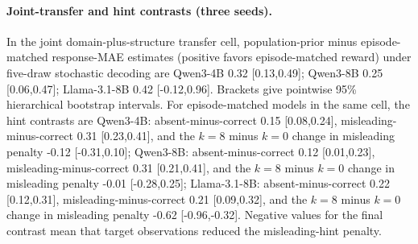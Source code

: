 \paragraph{Joint-transfer and hint contrasts (three seeds).} In the joint domain-plus-structure transfer cell, population-prior minus episode-matched response-MAE estimates (positive favors episode-matched reward) under five-draw stochastic decoding are Qwen3-4B 0.32 [0.13,0.49]; Qwen3-8B 0.25 [0.06,0.47]; Llama-3.1-8B 0.42 [-0.12,0.96]. Brackets give pointwise 95\% hierarchical bootstrap intervals. For episode-matched models in the same cell, the hint contrasts are Qwen3-4B: absent-minus-correct 0.15 [0.08,0.24], misleading-minus-correct 0.31 [0.23,0.41], and the $k=8$ minus $k=0$ change in misleading penalty -0.12 [-0.31,0.10]; Qwen3-8B: absent-minus-correct 0.12 [0.01,0.23], misleading-minus-correct 0.31 [0.21,0.41], and the $k=8$ minus $k=0$ change in misleading penalty -0.01 [-0.28,0.25]; Llama-3.1-8B: absent-minus-correct 0.22 [0.12,0.31], misleading-minus-correct 0.21 [0.09,0.32], and the $k=8$ minus $k=0$ change in misleading penalty -0.62 [-0.96,-0.32]. Negative values for the final contrast mean that target observations reduced the misleading-hint penalty.
